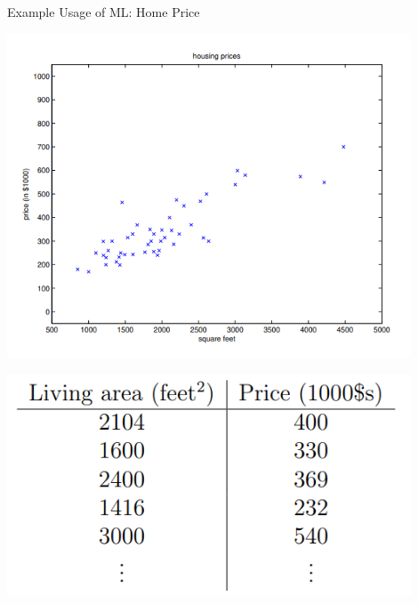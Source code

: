 \documentclass[serif, aspectratio=169]{beamer}
\begin{document}
\begin{frame}{Example Usage of ML: Home Price}
    \begin{minipage}{0.5\textwidth}
        \centering
        \includegraphics[width=0.9\textwidth]{pic/1.png}
    \end{minipage}%
    \begin{minipage}{0.5\textwidth}
        \centering
        \includegraphics[width=0.9\textwidth]{pic/2.png}
    \end{minipage}
\end{frame}
\end{document}
